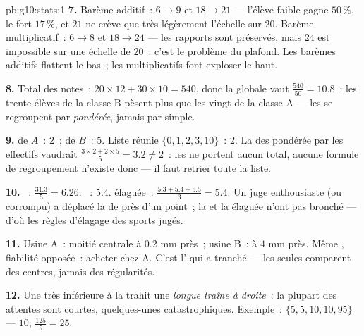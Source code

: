 \begin{solution}{pb:g10:stats:1}
\textbf{7.} Barème additif~: $6 \to 9$ et $18 \to 21$ --- l'élève
faible gagne $50\,\%$, le fort $17\,\%$, et $21$ ne crève que très
légèrement l'échelle sur $20$. Barème multiplicatif~: $6 \to 8$ et
$18 \to 24$ --- les rapports sont préservés, mais $24$ est
impossible sur une échelle de $20$~: c'est le problème du plafond.
Les barèmes additifs flattent le bas~; les multiplicatifs font
exploser le haut.

\textbf{8.} Total des notes~: $20 \times 12 + 30 \times 10 = 540$,
donc la  globale vaut $\frac{540}{50} = 10.8$~: les trente
élèves de la classe B pèsent plus que les vingt de la classe A ---
les  se regroupent par  \emph{pondérée}, jamais par
 simple.

\textbf{9.}  de $A$~: $2$~; de $B$~: $5$. Liste réunie
$\{0, 1, 2, 3, 10\}$~:  $2$. La  des  pondérée
par les effectifs vaudrait
$\frac{3 \times 2 + 2 \times 5}{5} = 3.2 \neq 2$~: les  ne
portent aucun total, aucune formule de regroupement n'existe donc ---
il faut retrier toute la liste.

\textbf{10.} ~: $\frac{31.3}{5} = 6.26$. ~: $5.4$.
 élaguée~: $\frac{5.3 + 5.4 + 5.5}{3} = 5.4$. Un juge
enthousiaste (ou corrompu) a déplacé la  de près d'un point~;
la  et la  élaguée n'ont pas bronché --- d'où les
règles d'élagage des sports jugés.

\textbf{11.} Usine A~: moitié centrale à $0.2$ mm près~; usine B~: à
$4$ mm près. Même , fiabilité opposée~: acheter chez A. C'est
l' qui a tranché --- les  seules comparent
des centres, jamais des régularités.

\textbf{12.} Une  très inférieure à la  trahit une
\emph{longue traîne à droite}~: la plupart des attentes sont courtes,
quelques-unes catastrophiques. Exemple~: $\{5, 5, 10, 10, 95\}$ ---
 $10$,  $\frac{125}{5} = 25$.


\end{solution}
